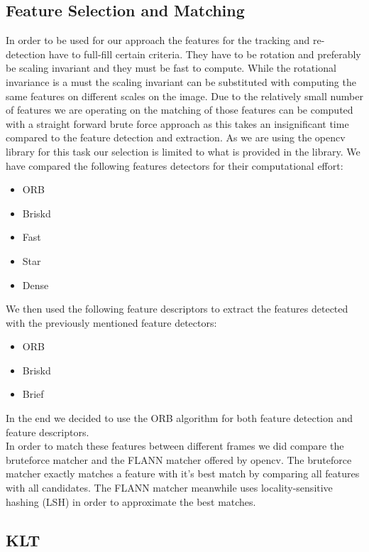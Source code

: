 \documentclass[10pt,conference,compsocconf]{IEEEtran}
\begin{document}
\subsection{Feature Selection and Matching}
In order to be used for our approach the features for the tracking and re-detection have to full-fill certain criteria. They have to be rotation and preferably be scaling invariant and they must be fast to compute. While the rotational invariance is a must the scaling invariant can be substituted with computing the same features on different scales on the image. Due to the relatively small number of features we are operating on the matching of those features can be computed with a straight forward brute force approach as this takes an insignificant time compared to the feature detection and extraction. As we are using the opencv library for this task our selection is limited to what is provided in the library. We have compared the following features detectors for their computational effort:

\begin{itemize}
\item ORB 
\item Briskd
\item Fast
\item Star
\item Dense
\end{itemize}

We then used the following feature descriptors to extract the features detected with the previously mentioned feature detectors:

\begin{itemize}
\item ORB
\item Briskd
\item Brief
\end{itemize}

In the end we decided to use the ORB algorithm for both feature detection and feature descriptors.\\
In order to match these features between different frames we did compare the bruteforce matcher and the FLANN matcher offered by opencv. The bruteforce matcher exactly matches a feature with it's best match by comparing all features with all candidates. The FLANN matcher meanwhile uses locality-sensitive hashing (LSH) in order to approximate the best matches.


\subsection{KLT}
\end{document}
